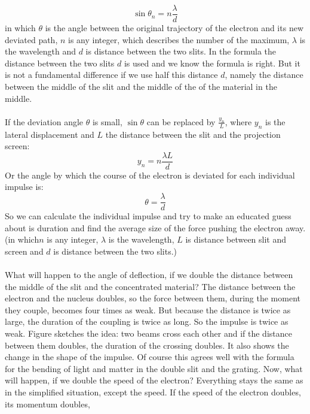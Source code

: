   \[\sin{\theta_n}= n \frac{\lambda }{d} \]
in which $\theta$ is the angle between the original trajectory of the electron and its new deviated path, $n$ is any integer, which describes the number of the maximum, $\lambda$ is the wavelength and $d$ is distance between the two slits. In the formula the distance between the two slits $d$ is used and we know the formula is right. But it is not a fundamental difference if we use half this distance $d$, namely the distance between the middle of the slit and the middle of the of the material in the middle.

\paragraph{}
If the deviation angle $\theta$ is small, $\sin{\theta} $  can be replaced by $\frac{y_n}{L}$, where $y_n$ is the lateral displacement and $L$ the distance between the slit and the projection screen:
   \[y_n = n \frac{\lambda L }{d} \]
Or the angle by which the course of the electron is deviated for each individual impulse is:
  \[ \theta = \frac{\lambda }{d} \]
So we can calculate the individual impulse and try to make an educated guess about is duration and find the average size of the force pushing the electron away.
(in which$n$ is any integer, $\lambda$ is the wavelength, $L$ is distance between slit and screen and $d$ is distance between the two slits.)

\paragraph{}
What will happen to the angle of deflection, if we double the distance between the middle of the slit and the concentrated material? The distance between the electron and the nucleus doubles, so the force between them, during the moment they couple, becomes four times as weak. But because the distance is twice as large, the duration of the coupling is twice as long. So the impulse is twice as weak. Figure sketches the idea: two beams cross each other and if the distance between them doubles, the duration of the crossing doubles. It also shows the change in the shape of the impulse. Of course this agrees well with the formula for the bending of light and matter in the double slit and the grating.
Now, what will happen, if we double the speed of the electron? Everything stays the same as in the simplified situation, except the speed. If the speed of the electron doubles, its momentum doubles, 

